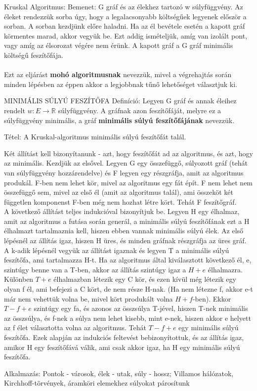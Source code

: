 \documentclass[]{article}
\begin{document}
\begin{framed}
Kruskal Algoritmus: Bemenet: G gráf és az élekhez tartozó w súlyfüggvény. Az éleket rendezzük sorba úgy, hogy a legalacsonyabb költségűek legyenek először a sorban. A sorban kezdjünk előre haladni. Ha az él bevétele esetén a kapott gráf körmentes marad, akkor vegyük be. Ezt addig ismételjük, amíg van izolált pont, vagy amíg az élsorozat végére nem érünk. A kapott gráf a G gráf minimális költségű feszítőfája.
\\
\\
Ezt az eljárást \textbf{mohó algoritmusnak} nevezzük, mivel a végrehajtás során minden lépésben az éppen akkor a legjobbnak tűnő lehetőséget választjuk ki.
\end{framed}
\begin{shaded}
MINIMÁLIS SÚLYÚ FESZÍTŐFA Definíció: Legyen G gráf és annak éleihez rendelt $w: E \rightarrow \mathbb{R}$ súlyfüggvény. A gráfnak azon feszítőfáját, melyre ez a súlyfüggvény minimális, a gráf \textbf{minimális súlyú feszítőfájának} nevezzük.
\end{shaded}
\begin{framed}
Tétel: A Kruskal-algoritmus minimális súlyú feszítőfát talál.
\end{framed}
\begin{leftbar}
Két állítást kell bizonyítanunk - azt, hogy feszítőfát ad az algoritmus, és azt, hogy az minimális. Kezdjük az elsővel. Legyen G egy összefüggő, súlyozott gráf (tehát van súlyfüggvény hozzárendelve) és F legyen egy részgráfja, amit az algoritmus produkál. F-ben nem lehet kör, mivel az algoritmus egy fát épít. F nem lehet nem összefüggő sem, mivel az első él (amit az algoritmus talál), ami összeköt két független komponenst F-ben még nem hozhat létre kört. Tehát F feszítőgráf.
\\
A következő állítást teljes indukcióval bizonyítjuk be. Legyen H egy élhalmaz, amit az algoritmus a futása során generál, a minimális súlyú feszítőfának ezt a H élhalmazt tartalmaznia kell, hiszen ebben vannak minimális súlyú élek.
Az első lépésnél az állítás igaz, hiszen H üres, és minden gráfnak részgráfja az üres gráf. A k-adik lépésnél vegyük az állítást igaznak és legyen T a minimális súlyú feszítőfa, ami tartalmazza H-t. Ha az algoritmus által kiválasztott következő él, e, szintúgy benne van a T-ben, akkor az állítás szintúgy igaz a $H + {e}$ élhalmazra. Különben $T + {e}$ élhalmazban létezik egy C kör, és ezen kívül még létezik egy olyan f él, ami befejezi a C kört, de nem része H-nak. (Ha nem létezne f, akkor e-t már nem vehettük volna be, mivel kört produkált volna $H + f$-ben). Ekkor $T - {f} + {e}$ szintúgy egy fa, és azonos az összsúlya T-jével, hiszen T-nek minimális az összsúlya, és f-nek a súlya nem lehet kisebb, mint e-nek, hiszen akkor e helyett az f élet választotta volna az algoritmus. Tehát $T - {f} + {e}$ egy minimális súlyú feszítőfa. Ezek alapján az indukciós feltevést bebizonyítottuk, és az állítás igaz, amikor H egy feszítőfává válik, ami csak akkor igaz, ha H egy minimális súlyú feszítőfa.
\end{leftbar}
\begin{framed}
Alkalmazás: Pontok - városok, élek - utak, súly - hossz; Villamos hálózatok, Kirchhoff-törvények, áramköri elemekhez súlyokat párosítunk
\end{framed}
\end{document}
